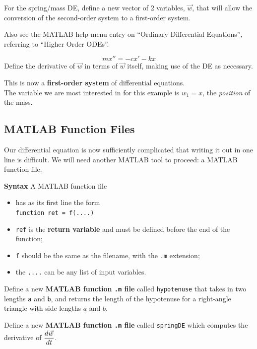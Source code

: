 \problem For the spring/mass DE, define a new vector of 2 variables,
$\vec{w}$, that will allow the conversion of the second-order system
to a first-order system.

\vfill

Also see the MATLAB help menu entry on ``Ordinary Differential
Equations'', referring to ``Higher Order ODEs''.

\newpage
$$ m  x'' = -c x' -kx $$
\problem Define the derivative of $\vec{w}$ in terms of $\vec{w}$
itself, making use of the DE as necessary.

\vfill
\vfill

This is now a {\bf first-order system} of differential equations.  \\
The variable we are most interested in for this example is $w_1 = x$,
the {\em position} of the mass.

\newpage

\subsection*{MATLAB Function Files}

Our differential equation is now sufficiently complicated that writing
it out in one line is difficult.  We will need another MATLAB tool to
proceed: a MATLAB function file.


{\bf Syntax} A MATLAB function file
\begin{itemize}
\item has as its first line the form \\
\verb#function ret = f(....)# 
\item \verb#ref# is the {\bf return variable} and must be defined before the end of the function;
\item \verb#f# should be the same as the filename, with the \verb#.m# extension;
\item the \verb#....# can be any list of input variables.
\end{itemize}

\newpage
\problem Define a new {\bf MATLAB function \texttt{.m} file} called
\verb#hypotenuse# that takes in two lengths \verb#a# and \verb#b#, and
returns the length of the hypotenuse for a right-angle triangle with
side lengths $a$ and $b$.

\newpage
\problem Define a new {\bf MATLAB function \texttt{.m} file} called
\verb#springDE# which computes the derivative of
$\displaystyle \frac{d \vec{w}}{dt}$.

